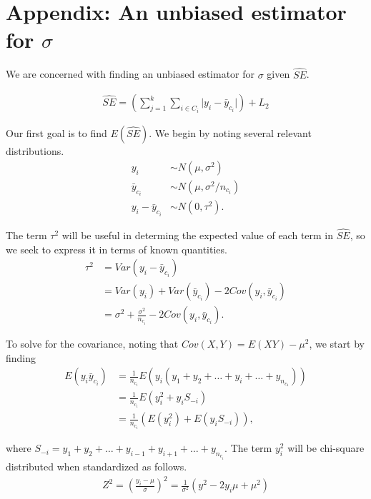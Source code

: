 \section{Appendix: An unbiased estimator for $\sigma$}
\label{Sec:AppSig}

We are concerned with finding an unbiased estimator for $\sigma$ given $\widehat{SE}$.

\begin{align}
\widehat{SE} = \left(\sum_{j=1}^k \sum_{i \in C_i} \lvert y_i - \bar{y}_{c_i} \rvert \right) + L_2 \label{eq:se}
\end{align}

Our first goal is to find $E(\widehat{SE})$. We begin by noting several relevant distributions.
\begin{align*}
y_i &\sim N(\mu, \sigma^2) \\
\bar{y}_{c_i} &\sim N(\mu, \sigma^2/n_{c_i}) \\
y_i - \bar{y}_{c_i} &\sim N(0, \tau^2).
\end{align*}

The term $\tau^2$ will be useful in determing the expected value of each term in $\widehat{SE}$, so we seek to express it in terms of known quantities.
\begin{align}
\tau^2 &= Var(y_i - \bar{y}_{c_i}) \nonumber \\
&= Var(y_i) + Var(\bar{y}_{c_i}) - 2 Cov(y_i, \bar{y}_{c_i}) \nonumber \\
&= \sigma^2 + \frac{\sigma^2}{n_{c_i}} - 2 Cov(y_i, \bar{y}_{c_i}). \label{eq:tau}
\end{align}

To solve for the covariance, noting that $Cov(X,Y) = E(XY) - \mu^2$, we start by finding
\begin{align}
E(y_i \bar{y}_{c_i}) &= \frac{1}{n_{c_i}} E(y_i (y_1 + y_2 + \ldots + y_i + \ldots + y_{n_{c_1}})) \nonumber \\
&= \frac{1}{n_{c_i}} E(y_i^2 + y_i S_{-i}) \nonumber \\
&= \frac{1}{n_{c_i}}\left( E\left(y_i^2\right) + E\left(y_i S_{-i}\right)\right), \label{eq:eyy}
\end{align}

where $S_{-i} = y_1 + y_2 + \ldots + y_{i-1} + y_{i+1} + \ldots + y_{n_{c_i}}$. The term $y_i^2$ will be chi-square distributed when standardized as follows.
\begin{align*}
Z^2 = \left(\frac{y_i - \mu}{\sigma}\right)^2 = \frac{1}{\sigma^2}\left(y^2 - 2y_i\mu + \mu^2\right)
\end{align*}


